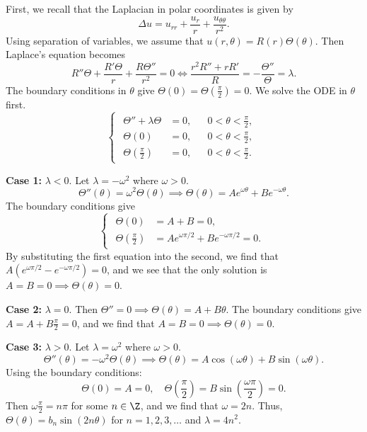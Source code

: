 \documentclass[plain]{pset}
\begin{document}
\begin{solution}
    First, we recall that the Laplacian in polar coordinates is given by
    \[
        \Delta u = u_{rr} + \frac{u_r}{r} + \frac{u_{\theta\theta}}{r^2}.
    \]
    Using separation of variables, we assume that \(u(r, \theta) = R(r)\Theta(\theta)\). Then Laplace's equation becomes
    \[
        R''\Theta + \frac{R'\Theta}{r} + \frac{R\Theta''}{r^2} = 0 \iff \frac{r^2R'' + rR'}{R} = -\frac{\Theta''}{\Theta} = \lambda.
    \]
    The boundary conditions in \(\theta\) give \(\Theta(0) = \Theta\left(\frac{\pi}{2}\right) = 0\). We solve the ODE in \(\theta\) first.
    \[
        \begin{cases}
            \begin{aligned}
                \Theta'' + \lambda\Theta & = 0, &  & 0 < \theta < \frac{\pi}{2}, \\
                \Theta(0)                & = 0, &  & 0 < \theta < \frac{\pi}{2}, \\
                \Theta\left(\frac{\pi}{2}\right) & = 0, &  & 0 < \theta < \frac{\pi}{2}.
            \end{aligned}
        \end{cases}
    \]

    \textbf{Case 1:} \(\lambda < 0\). Let \(\lambda = -\omega^2\) where \(\omega > 0\).
    \[\Theta''(\theta) = \omega^2 \Theta(\theta) \implies \Theta(\theta) = Ae^{\omega\theta} + Be^{-\omega\theta}.\]
    The boundary conditions give
    \[
        \begin{cases}
            \begin{aligned}
                \Theta(0)                & = A + B = 0, \\
                \Theta\left(\frac{\pi}{2}\right) & = Ae^{\omega\pi/2} + Be^{-\omega\pi/2} = 0.
            \end{aligned}
        \end{cases}
    \]
    By substituting the first equation into the second, we find that \(A\left(e^{\omega\pi/2} - e^{-\omega\pi/2}\right) = 0\), and we see that the only solution is \(A = B = 0 \implies \Theta(\theta) = 0\).

    \textbf{Case 2:} \(\lambda = 0\). Then \(\Theta'' = 0 \implies \Theta(\theta) = A + B\theta\). The boundary conditions give \(A = A + B\frac{\pi}{2} = 0\), and we find that \(A = B = 0 \implies \Theta(\theta) = 0\).

    \textbf{Case 3:} \(\lambda > 0\). Let \(\lambda = \omega^2\) where \(\omega > 0\).
    \[\Theta''(\theta) = -\omega^2 \Theta(\theta) \implies \Theta(\theta) = A\cos(\omega\theta) + B\sin(\omega\theta).\]
    Using the boundary conditions:
    \[\Theta(0) = A = 0, \quad \Theta\left(\frac{\pi}{2}\right) = B\sin\left(\frac{\omega\pi}{2}\right) = 0.\]
    Then \(\omega\frac{\pi}{2} = n\pi\) for some \(n \in \Z\), and we find that \(\omega = 2n\). Thus, \(\Theta(\theta) = b_n\sin(2n\theta)\) for \(n = 1, 2, 3, \ldots\) and \(\lambda = 4n^2\).


\end{solution}
\end{document}
